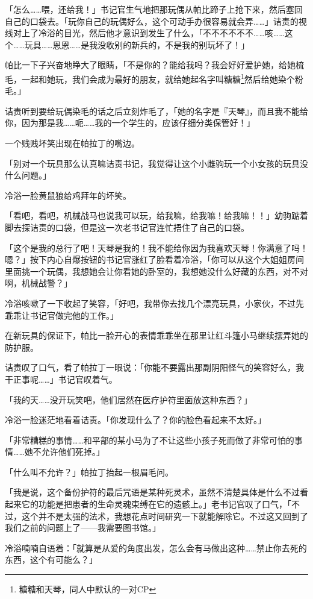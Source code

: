 「怎么……喂，还给我！」书记官生气地把那玩偶从帕比蹄子上抢下来，然后塞回自己的口袋去。「玩你自己的玩偶好么，这个可动手办很容易就会弄……」诘责的视线对上了冷浴的目光，然后他才意识到发生了什么，「不不不不不不……咳……这个……玩具……恩恩……是我没收别的新兵的，不是我的别玩坏了！」

帕比一下子兴奋地睁大了眼睛，「不是你的？能给我吗？我会好好爱护她，给她梳毛，一起和她玩，我们会成为最好的朋友，就给她起名字叫糖糖\footnote{糖糖和天琴，同人中默认的一对CP}然后给她染个粉毛。」

诘责听到要给玩偶染毛的话之后立刻炸毛了，「她的名字是『天琴』，而且我不能给你，因为那是我……呃……我的一个学生的，应该仔细分类保管好！」

一个贱贱坏笑出现在帕拉丁的嘴边。

「别对一个玩具那么认真嘛诘责书记，我觉得让这个小雌驹玩一个小女孩的玩具没什么问题。」

冷浴一脸黄鼠狼给鸡拜年的坏笑。

「看吧，看吧，机械战马也说我可以玩，给我嘛，给我嘛！给我嘛！！」幼驹踮着脚去探诘责的口袋，但是这一次老书记官连忙捂住了自己的口袋。

「这个是我的总行了吧！天琴是我的！我不能给你因为我喜欢天琴！你满意了吗！嗯？」按下内心自爆按钮的书记官涨红了脸看着冷浴，「你可以从这个大姐姐房间里面挑一个玩偶，我想她会让你看她的卧室的，我想她没什么好藏的东西，对不对啊，机械战警？」

冷浴咳嗽了一下收起了笑容，「好吧，我带你去找几个漂亮玩具，小家伙，不过先乖乖让书记官做完他的工作。」

在新玩具的保证下，帕比一脸开心的表情乖乖坐在那里让红斗篷小马继续摆弄她的防护服。

诘责叹了口气，看了帕拉丁一眼说：「你能不要露出那副阴阳怪气的笑容好么，我干正事呢……」书记官叹着气。

「我的天……没开玩笑吧，他们居然在医疗护符里面放这种东西？」

冷浴一脸迷茫地看着诘责。「你发现什么了？你的脸色看起来不太好。」

「非常糟糕的事情……和平部的某小马为了不让这些小孩子死而做了非常可怕的事情……她不允许他们死掉。」

「什么叫不允许？」帕拉丁抬起一根眉毛问。

「我是说，这个备份护符的最后咒语是某种死灵术，虽然不清楚具体是什么不过看起来它的功能是把患者的生命灵魂束缚在它的遗骸上。」老书记官叹了口气，「不过，这个并不是太强的法术，我想花点时间研究一下就能解除它。不过这又回到了我们之前的问题上了——我需要图书馆。」

冷浴喃喃自语着：「就算是从爱的角度出发，怎么会有马做出这种……禁止你去死的东西，这个有可能么？」

